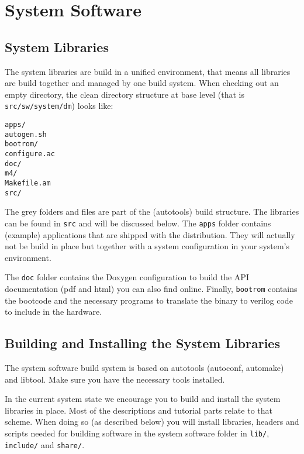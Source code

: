 \chapter{System Software}
\label{chap:systemsoftware}

\section{System Libraries}

The system libraries are build in a unified environment, that means
all libraries are build together and managed by one build system. When
checking out an empty directory, the clean directory structure at base
level (that is \verb|src/sw/system/dm|) looks like:

\begin{alltt}
apps/
{\color{graydir}autogen.sh}
bootrom/
{\color{graydir}configure.ac}
doc/
{\color{graydir}m4/}
{\color{graydir}Makefile.am}
src/
\end{alltt}

The grey folders and files are part of the (autotools) build
structure. The libraries can be found in \verb|src| and will be
discussed below. The \verb|apps| folder contains (example)
applications that are shipped with the distribution. They will
actually not be build in place but together with a system
configuration in your system's environment.

The \verb|doc| folder contains the Doxygen configuration to build the
API documentation (pdf and html) you can also find online. Finally,
\verb|bootrom| contains the bootcode and the necessary programs to
translate the binary to verilog code to include in the hardware.

\section{Building and Installing the System Libraries}

The system software build system is based on autotools (autoconf,
automake) and libtool. Make sure you have the necessary tools
installed.

In the current system state we encourage you to build and install the
system libraries in place. Most of the descriptions and tutorial parts
relate to that scheme. When doing so (as described below) you will
install libraries, headers and scripts needed for building software in
the system software folder in \verb|lib/|, \verb|include/| and
\verb|share/|.

